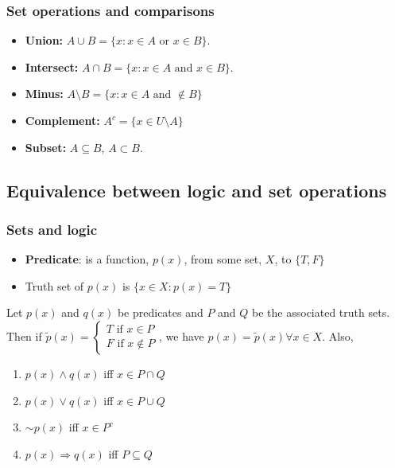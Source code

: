 \documentclass[compress]{beamer}
\begin{document}
\begin{frame}
  \frametitle{Set operations and comparisons}
  \begin{itemize}
  \item \textbf{Union:} $A \cup B = \{x: x\in A \text{ or } x \in B\}$.
  \item \textbf{Intersect:} $A \cap B = \{x: x \in A \text{ and } x \in
    B\}$. 
  \item \textbf{Minus:} $A \setminus B = \{ x: x\in A \text{ and }
    \not\in B \}$
  \item \textbf{Complement:} $A^c = \{x \in U \setminus A\}$
  \item \textbf{Subset:} $A \subseteq B$, $A \subset B$.
  \end{itemize}
\end{frame}

\subsection{Equivalence between logic and set
  operations \label{s:setLogic}} 

\begin{frame}
  \frametitle{Sets and logic}
  \begin{itemize}
  \item \textbf{Predicate}: is a function, $p(x)$, from some set, $X$,
    to $\{T, F \}$
  \item Truth set of $p(x)$ is $\{x \in X: p(x) = T \}$
  \end{itemize}
  \begin{theorem} Let $p(x)$
    and $q(x)$ be predicates and $P$ and $Q$ be
    the associated truth sets. Then if $\tilde{p}(x) = \begin{cases} T
      \text{ if } x \in P \\ 
      F \text{ if } x \not\in P \end{cases}$, we have $p(x) = \tilde{p}(x)
    \forall x \in X$. Also, 
    \begin{enumerate}
    \item\label{i1} $p(x) \wedge q(x)$ iff $x \in P \cap Q$
    \item\label{i2} $p(x) \vee q(x)$ iff $x \in P \cup Q$
    \item\label{i3} $\sim p(x)$ iff $x \in P^c$
    \item\label{i4} $p(x) \Rightarrow q(x)$ iff $P \subseteq Q$
    \end{enumerate}
  \end{theorem}
\end{frame}
\end{document}
